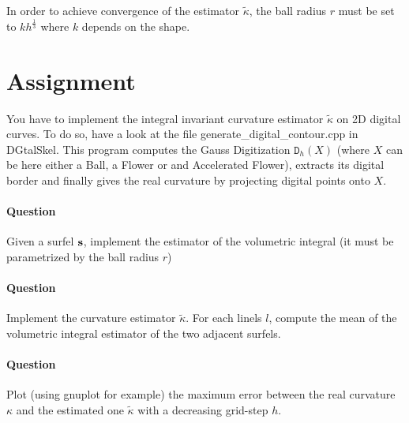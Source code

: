 \documentclass[a4paper, 11pt]{article}
\begin{document}
In order to achieve convergence of the estimator $\tilde{\kappa}$, the ball radius $r$ must be set to $k h^{\frac{1}{3}}$ where $k$ depends on the shape.

\section*{Assignment}

You have to implement the integral invariant curvature estimator $\tilde{\kappa}$ on 2D digital curves. To do so, have a look at the file generate\_digital\_contour.cpp in DGtalSkel.
This program computes the Gauss Digitization $\mathtt{D}_h(X)$ (where $X$ can be here either a Ball, a Flower or and Accelerated Flower), extracts its digital border
and finally gives the real curvature by projecting digital points onto $X$.

\paragraph{Question} Given a surfel $\bf{s}$, implement the estimator of the volumetric integral (it must be parametrized by the ball radius $r$)

\paragraph{Question} Implement the curvature estimator $\tilde{\kappa}$. For each linels $l$, compute the mean of the volumetric integral estimator of the two adjacent surfels.

\paragraph{Question} Plot (using gnuplot for example) the maximum error between the real curvature $\kappa$ and the estimated one $\tilde{\kappa}$ with a decreasing grid-step $h$.
\end{document}
